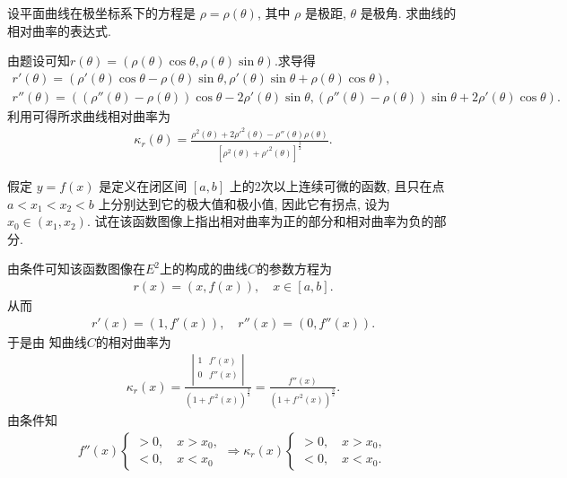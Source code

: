 \documentclass[../../main.tex]{subfiles}%
\begin{document}
\begin{example}
设平面曲线在极坐标系下的方程是 $\rho=\rho(\theta)$, 其中 $\rho$ 是极距, $\theta$ 是极角. 求曲线的相对曲率的表达式.
\end{example}
\begin{solution}
由题设可知$r \left( \theta \right) =\left( \rho(\theta)\cos \theta ,\rho(\theta)\sin \theta \right)$.求导得
\begin{gather*}
r'(\theta)=\left( \rho'(\theta)\cos\theta-\rho(\theta)\sin\theta,\rho'(\theta)\sin\theta+\rho(\theta)\cos\theta \right),\\
r''(\theta)=\left( \left( \rho''(\theta)-\rho(\theta) \right)\cos\theta-2\rho'(\theta)\sin\theta,\left( \rho''(\theta)-\rho(\theta) \right)\sin\theta+2\rho'(\theta)\cos\theta \right).
\end{gather*}
利用可得所求曲线相对曲率为
\begin{align*}
\kappa_r(\theta)=\frac{\rho^2(\theta)+2\rho'^2(\theta)-\rho''(\theta)\rho(\theta)}{\left[ \rho^2(\theta)+\rho'^2(\theta) \right]^{\frac{3}{2}}}.
\end{align*}

\end{solution}

\begin{example}
假定 $y=f(x)$ 是定义在闭区间 $[a,b]$ 上的2次以上连续可微的函数, 且只在点 $a<x_1<x_2<b$ 上分别达到它的极大值和极小值, 因此它有拐点, 设为 $x_0\in(x_1,x_2)$. 试在该函数图像上指出相对曲率为正的部分和相对曲率为负的部分.
\end{example}
\begin{solution}
由条件可知该函数图像在$E^2$上的构成的曲线$C$的参数方程为
\begin{align*}
r(x) = \left( x,f(x) \right) ,\quad x\in \left[ a,b \right] .
\end{align*}
从而
\begin{align*}
r'(x) = \left( 1,f'(x) \right) ,\quad r''(x) = \left( 0,f''(x) \right) .
\end{align*}
于是由
知曲线$C$的相对曲率为
\begin{align*}
\kappa _r(x)=\frac{\left| \begin{matrix}
1&		f'(x)\\
0&		f'' (x)\\
\end{matrix} \right|}{\left( 1+f'^2(x) \right)^{\frac{3}{2}}}=\frac{f'' (x)}{\left( 1+f'^2(x) \right)^{\frac{3}{2}}}.
\end{align*}
由条件知
\begin{align*}
f''(x)
\begin{cases}
>0,\quad x>x_0, \\
<0,\quad x<x_0
\end{cases}\Longrightarrow \kappa_r(x)\begin{cases}
>0,\quad x>x_0, \\
<0,\quad x<x_0.
\end{cases}
\end{align*}

\end{solution}
\end{document}
